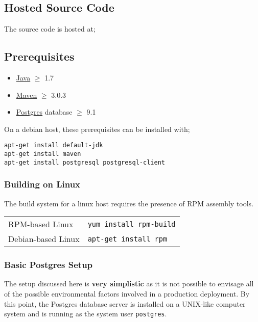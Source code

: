 \subsection{Hosted Source Code}

The source code is hosted at;


\subsection{Prerequisites}
\label{prerequisites}

\begin{itemize}
\item \href{https://community.java.net/open-jdk}{Java} $\geqslant$ 1.7
\item \href{http://maven.apache.org}{Maven} $\geqslant$ 3.0.3
\item \href{http://www.postgres.org}{Postgres} database $\geqslant$ 9.1
\end{itemize}

On a debian host, these prerequisites can be installed with;

\begin{verbatim}
apt-get install default-jdk
apt-get install maven
apt-get install postgresql postgresql-client
\end{verbatim}

\subsubsection{Building on Linux}
\label{prerequisites-buildingonlinux}

The build system for a linux host requires the presence of RPM assembly tools.

\begin{tabular}{|l|l|}
\hline
RPM-based Linux & {\tt yum install rpm-build} \\
Debian-based Linux & {\tt apt-get install rpm} \\
\hline
\end{tabular}

\subsubsection{Basic Postgres Setup}

The setup discussed here is {\bf very simplistic} as it is not possible to envisage all of the possible environmental factors involved in a production deployment.  By this point, the Postgres database server is  installed on a UNIX-like computer system and is running as the system user {\tt postgres}.


